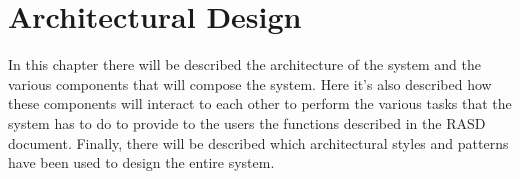 \documentclass[../../dd.tex]{subfiles}
\begin{document}
	\chapter{Architectural Design}
		In this chapter there will be described the architecture of the system and the various components that will compose the system.
		Here it's also described how these components will interact to each other to perform the various tasks that the system has to do to provide to the users the functions described in the RASD document.
		Finally, there will be described which architectural styles and patterns have been used to design the entire system.

		

		

		

		

		

		

		

		
\end{document}
